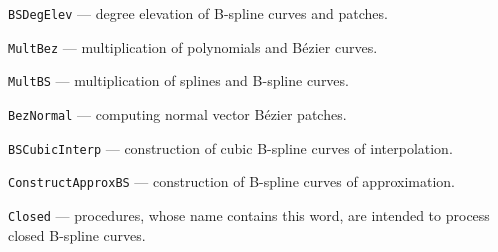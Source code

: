\begin{mydescription}
  \item\texttt{BSDegElev} --- degree elevation of B-spline curves and patches.
  \item\texttt{MultBez} --- multiplication of polynomials and B\'{e}zier curves.
  \item\texttt{MultBS} --- multiplication of splines and B-spline curves.
  \item\texttt{BezNormal} --- computing normal vector B\'{e}zier patches.
  \item\texttt{BSCubicInterp} --- construction of cubic B-spline curves of
    interpolation.
  \item\texttt{ConstructApproxBS} --- construction of B-spline curves of
    approximation.
  \item\texttt{Closed} --- procedures, whose name contains this word, are
    intended to process closed B-spline curves.
\end{mydescription}

